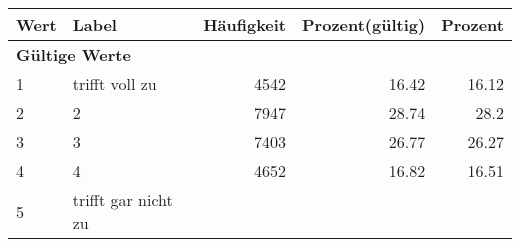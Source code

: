      \begin{longtable}{lXrrr}
     \toprule
     \textbf{Wert} & \textbf{Label} & \textbf{Häufigkeit} & \textbf{Prozent(gültig)} & \textbf{Prozent} \\
     \endhead
     \midrule
     \multicolumn{5}{l}{\textbf{Gültige Werte}}\\

     1 &
     \multicolumn{1}{X}{ trifft voll zu   } &


       \num{4542} &
       \num[round-mode=places,round-precision=2]{16,42} &
         \num[round-mode=places,round-precision=2]{16,12} \\

     2 &
     \multicolumn{1}{X}{ 2   } &


       \num{7947} &
       \num[round-mode=places,round-precision=2]{28,74} &
         \num[round-mode=places,round-precision=2]{28,2} \\

     3 &
     \multicolumn{1}{X}{ 3   } &


       \num{7403} &
       \num[round-mode=places,round-precision=2]{26,77} &
         \num[round-mode=places,round-precision=2]{26,27} \\

     4 &
     \multicolumn{1}{X}{ 4   } &


       \num{4652} &
       \num[round-mode=places,round-precision=2]{16,82} &
         \num[round-mode=places,round-precision=2]{16,51} \\

     5 &
     \multicolumn{1}{X}{ trifft gar nicht zu   } &



\end{longtable}
